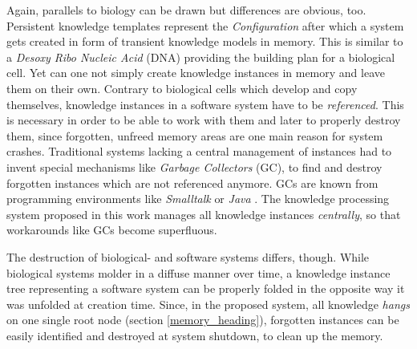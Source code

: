 Again, parallels to biology can be drawn but differences are obvious, too.
Persistent knowledge templates represent the \emph{Configuration} after which a
system gets created in form of transient knowledge models in memory. This is
similar to a \emph{Desoxy Ribo Nucleic Acid} (DNA) providing the building plan
for a biological cell. Yet can one not simply create knowledge instances in
memory and leave them on their own. Contrary to biological cells which develop
and copy themselves, knowledge instances in a software system have to be
\emph{referenced}. This is necessary in order to be able to work with them and
later to properly destroy them, since forgotten, unfreed memory areas are one
main reason for system crashes. Traditional systems lacking a central management
of instances had to invent special mechanisms like \emph{Garbage Collectors}
(GC), to find and destroy forgotten instances which are not referenced anymore.
GCs are known from programming environments like \emph{Smalltalk}
\cite{smalltalk} or \emph{Java} \cite{java}. The knowledge processing system
proposed in this work manages all knowledge instances \emph{centrally}, so that
workarounds like GCs become superfluous.

The destruction of biological- and software systems differs, though. While
biological systems molder in a diffuse manner over time, a knowledge instance
tree representing a software system can be properly folded in the opposite way
it was unfolded at creation time. Since, in the proposed system, all knowledge
\emph{hangs} on one single root node (section \ref{memory_heading}), forgotten
instances can be easily identified and destroyed at system shutdown, to clean
up the memory.
